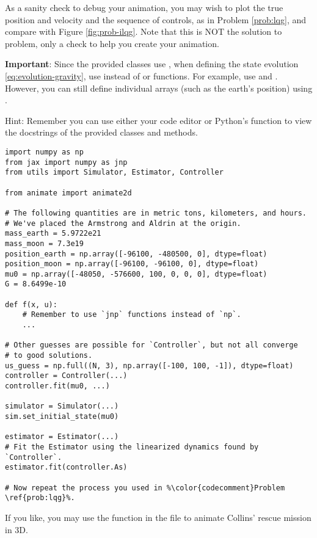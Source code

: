 \begin{problem}
As a sanity check to debug your animation, you may wish to plot the true position and velocity and the sequence of controls, as in Problem \ref{prob:lqg}, and compare with Figure \ref{fig:prob-ilqg}.
Note that this is NOT the solution to problem, only a check to help you create your animation.

\textbf{Important}: Since the provided classes use , when defining the state evolution \eqref{eq:evolution-gravity}, use  instead of  or  functions.
For example, use  and .
However, you can still define individual arrays (such as the earth's position) using .

Hint: Remember you can use either your code editor or Python's  function to view the docstrings of the provided classes and methods.

\begin{lstlisting}[escapechar=\%]
import numpy as np
from jax import numpy as jnp
from utils import Simulator, Estimator, Controller

from animate import animate2d

# The following quantities are in metric tons, kilometers, and hours.
# We've placed the Armstrong and Aldrin at the origin.
mass_earth = 5.9722e21
mass_moon = 7.3e19
position_earth = np.array([-96100, -480500, 0], dtype=float)
position_moon = np.array([-96100, -96100, 0], dtype=float)
mu0 = np.array([-48050, -576600, 100, 0, 0, 0], dtype=float)
G = 8.6499e-10

def f(x, u):
    # Remember to use `jnp` functions instead of `np`.
    ...

# Other guesses are possible for `Controller`, but not all converge
# to good solutions.
us_guess = np.full((N, 3), np.array([-100, 100, -1]), dtype=float)
controller = Controller(...)
controller.fit(mu0, ...)

simulator = Simulator(...)
sim.set_initial_state(mu0)

estimator = Estimator(...)
# Fit the Estimator using the linearized dynamics found by `Controller`.
estimator.fit(controller.As)

# Now repeat the process you used in %\color{codecomment}Problem \ref{prob:lqg}%.
\end{lstlisting}

If you like, you may use the function  in the  file to animate Collins' rescue mission in 3D.
\label{prob:ilqg}
\end{problem}

